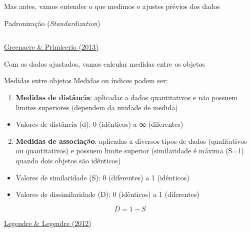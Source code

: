 \documentclass[
  ignorenonframetext,
]{beamer}
\providecommand{\tightlist}{%
  \setlength{\itemsep}{0pt}\setlength{\parskip}{0pt}}\usepackage{longtable,booktabs,array}
\begin{document}
\begin{frame}{Mas antes, vamos entender o que medimos e ajustes prévios
dos dados}
\begin{block}{Padronização (\emph{Standardization})}
\begin{columns}[T]
\begin{column}{0.5\textwidth}
\end{column}

\begin{column}{0.5\textwidth}
\end{column}
\end{columns}

\href{https://www.fbbva.es/microsite/multivariate-statistics/}{Greenacre
\& Primicerio (2013)}
\end{block}
\end{frame}

\begin{frame}{Com os dados ajustados, vamos calcular medidas entre os
objetos}
\protect\hypertarget{com-os-dados-ajustados-vamos-calcular-medidas-entre-os-objetos}{}
\begin{block}{Medidas entre objetos}
\protect\hypertarget{medidas-entre-objetos}{}
Medidas ou índices podem ser:

\begin{enumerate}
\tightlist
\item
  \textbf{Medidas de distância}: aplicadas a dados quantitativos e não
  possuem limites superiores (dependem da unidade de medida)
\end{enumerate}

\begin{itemize}
\tightlist
\item
  Valores de distância (d): 0 (idênticos) a ∞ (diferentes)
\end{itemize}

\pause

\begin{enumerate}
\setcounter{enumi}{1}
\tightlist
\item
  \textbf{Medidas de associação}: aplicadas a diversos tipos de dados
  (qualitativos ou quantitativos) e possuem limite superior
  (similaridade é máxima (S=1) quando dois objetos são idênticos)
\end{enumerate}

\begin{itemize}
\item
  Valores de similaridade (S): 0 (diferentes) a 1 (idênticos)
\item
  Valores de dissimilaridade (D): 0 (idênticos) a 1 (diferentes)
\end{itemize}

\[D = 1 - S\]

\href{http://www.numericalecology.com/indexen.html}{Legendre \& Legendre
(2012)}
\end{block}


\end{frame}
\end{document}
